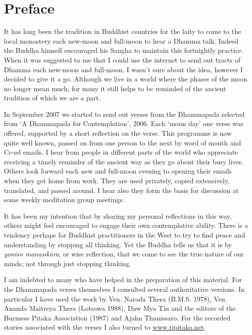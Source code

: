 
\chapter{Preface}

It has long been the tradition in Buddhist countries for the laity to
come to the local monastery each new-moon and full-moon to hear a Dhamma
talk. Indeed the Buddha himself encouraged his Sangha to maintain this
fortnightly practice. When it was suggested to me that I could use the
internet to send out tracts of Dhamma each new-moon and full-moon, I
wasn't sure about the idea, however I decided to give it a go. Although
we live in a world where the phases of the moon no longer mean much, for
many it still helps to be reminded of the ancient tradition of which we
are a part.

In September 2007 we started to send out verses from the Dhammapada
selected from `A Dhammapada for Contemplation', 2006. Each `moon day'
one verse was offered, supported by a short reflection on the verse.
This programme is now quite well known, passed on from one person to the
next by word of mouth and Cc-ed emails. I hear from people in different
parts of the world who appreciate receiving a timely reminder of the
ancient way as they go about their busy lives. Others look forward each
new and full-moon evening to opening their emails when they get home
from work. They are used privately, copied extensively, translated, and
passed around. I hear also they form the basis for discussion at some
weekly meditation group meetings.

It has been my intention that by sharing my personal reflections in this
way, others might feel encouraged to engage their own contemplative
ability. There is a tendency perhaps for Buddhist practitioners in the
West to try to find peace and understanding by stopping all thinking.
Yet the Buddha tells us that it is by \emph{yoniso manasikāra}, or wise
reflection, that we come to see the true nature of our minds; not
through just stopping thinking.

I am indebted to many who have helped in the preparation of this
material. For the Dhammapada verses themselves I consulted several
authoritative versions. In particular I have used the work by Ven.
Narada Thera (B.M.S. 1978), Ven. Ananda Maitreya Thera (Lotsawa 1988),
Daw Mya Tin and the editors of the Burmese Pitaka Association (1987) and
Ajahn Thanissaro. For the recorded stories associated with the verses I
also turned to \href{http://www.tipitaka.net/}{www.tipitaka.net}.


